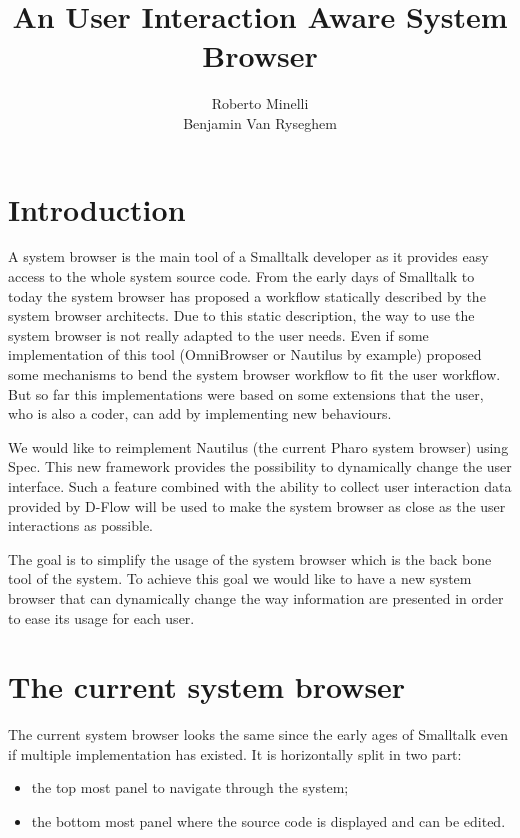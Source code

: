 \documentclass[12pt]{article}
\begin{document}
\title{An User Interaction Aware System Browser}
\author{Roberto Minelli\\Benjamin Van Ryseghem}
\maketitle

\section{Introduction}

A system browser is the main tool of a Smalltalk developer as it provides easy access to the whole system source code.
From the early days of Smalltalk to today the system browser has proposed a workflow statically described by the system browser architects.
Due to this static description, the way to use the system browser is not really adapted to the user needs. 
Even if some implementation of this tool (OmniBrowser or Nautilus by example) proposed some mechanisms to bend the system browser workflow to fit the user workflow.
But so far this implementations were based on some extensions that the user, who is also a coder, can add by implementing new behaviours.

We would like to reimplement Nautilus (the current Pharo system browser) using Spec.
This new framework provides the possibility to dynamically change the user interface.
Such a feature combined with the ability to collect user interaction data provided by D-Flow will be used to make the system browser 
as close as the user interactions as possible.

The goal is to simplify the usage of the system browser which is the back bone tool of the system. 
To achieve this goal we would like to have a new system browser that can dynamically change the way information are presented in order to ease its usage for each user.


\section{The current system browser}

The current system browser looks the same since the early ages of Smalltalk even if multiple implementation has existed.
It is horizontally split in two part:
\begin{itemize}
	\item the top most panel to navigate through the system;
	\item the bottom most panel where the source code is displayed and can be edited.
\end{itemize}
\end{document}
